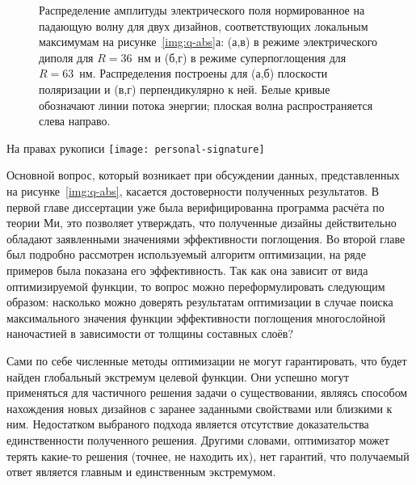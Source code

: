 \begin{figure}[t]
  \caption{ Распределение амплитуды электрического поля нормированное
    на падающую волну для двух дизайнов, соответствующих локальным
    максимумам на рисунке~\ref{img:q-abs}а: (а,в) в режиме
    электрического диполя для $R=36$~нм и (б,г) в режиме
    суперпоглощения для $R=63$~нм. Распределения построены для (а,б)
    плоскости поляризации и (в,г) перпендикулярно к ней. Белые кривые
    обозначают линии потока энергии; плоская волна распространяется
    слева направо.}
  \label{img:absorb-field}  

\end{figure}

\begin{flushright}
  \large{На правах рукописи}
  \texttt{[image: personal-signature]} 
\end{flushright}



Основной вопрос, который возникает при обсуждении данных,
представленных на рисунке~\ref{img:q-abs}, касается достоверности
полученных результатов.  В первой главе диссертации уже была
верифицированна программа расчёта по теории Ми, это позволяет
утверждать, что полученные дизайны действительно обладают заявленными
значениями эффективности поглощения.  Во второй главе был подробно
рассмотрен используемый алгоритм оптимизации, на ряде примеров была
показана его эффективность.  Так как она зависит от вида
оптимизируемой функции, то вопрос можно переформулировать следующим
образом: насколько можно доверять результатам оптимизации в случае
поиска максимального значения функции эффективности поглощения
многослойной наночастией в зависимости от толщины составных слоёв?

Сами по себе численные методы оптимизации не могут гарантировать, что
будет найден глобальный экстремум целевой функции. Они успешно
могут применяться для частичного решения задачи о существовании,
являясь способом нахождения новых дизайнов с заранее заданными
свойствами или близкими к ним.  Недостатком выбраного подхода является
отсутствие доказательства единственности полученного решения.  Другими
словами, оптимизатор может терять какие-то решения (точнее, не
находить их), нет гарантий, что получаемый ответ является главным и
единственным экстремумом.


